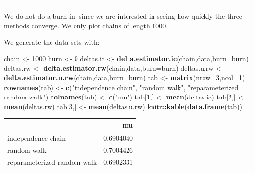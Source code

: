 \documentclass[
  11pt,
]{paper}
\newenvironment{Shaded}{\begin{snugshade}}{\end{snugshade}}
\newcommand{\AttributeTok}[1]{\textcolor[rgb]{0.13,0.29,0.53}{#1}}
\newcommand{\DecValTok}[1]{\textcolor[rgb]{0.00,0.00,0.81}{#1}}
\newcommand{\FunctionTok}[1]{\textcolor[rgb]{0.13,0.29,0.53}{\textbf{#1}}}
\newcommand{\NormalTok}[1]{#1}
\newcommand{\OtherTok}[1]{\textcolor[rgb]{0.56,0.35,0.01}{#1}}
\newcommand{\SpecialCharTok}[1]{\textcolor[rgb]{0.81,0.36,0.00}{\textbf{#1}}}
\newcommand{\StringTok}[1]{\textcolor[rgb]{0.31,0.60,0.02}{#1}}
\begin{document}
\begin{center}\rule{0.5\linewidth}{0.5pt}\end{center}

We do not do a burn-in, since we are interested in seeing how quickly
the three methods converge. We only plot chains of length \(1000\).

We generate the data sets with:

\begin{Shaded}
\begin{Highlighting}[]
\NormalTok{chain }\OtherTok{\textless{}{-}} \DecValTok{1000}
\NormalTok{burn }\OtherTok{\textless{}{-}} \DecValTok{0}
\NormalTok{deltas.ic }\OtherTok{\textless{}{-}} \FunctionTok{delta.estimator.ic}\NormalTok{(chain,data,}\AttributeTok{burn=}\NormalTok{burn)}
\NormalTok{deltas.rw }\OtherTok{\textless{}{-}} \FunctionTok{delta.estimator.rw}\NormalTok{(chain,data,}\AttributeTok{burn=}\NormalTok{burn)}
\NormalTok{deltas.u.rw }\OtherTok{\textless{}{-}} \FunctionTok{delta.estimator.u.rw}\NormalTok{(chain,data,}\AttributeTok{burn=}\NormalTok{burn)}
\NormalTok{tab }\OtherTok{\textless{}{-}} \FunctionTok{matrix}\NormalTok{(}\AttributeTok{nrow=}\DecValTok{3}\NormalTok{,}\AttributeTok{ncol=}\DecValTok{1}\NormalTok{)}
\FunctionTok{rownames}\NormalTok{(tab) }\OtherTok{\textless{}{-}} \FunctionTok{c}\NormalTok{(}\StringTok{"independence chain"}\NormalTok{,}
                   \StringTok{"random walk"}\NormalTok{,}
                   \StringTok{"reparameterized random walk"}\NormalTok{)}
\FunctionTok{colnames}\NormalTok{(tab) }\OtherTok{\textless{}{-}} \FunctionTok{c}\NormalTok{(}\StringTok{"mu"}\NormalTok{)}
\NormalTok{tab[}\DecValTok{1}\NormalTok{,] }\OtherTok{\textless{}{-}} \FunctionTok{mean}\NormalTok{(deltas.ic)}
\NormalTok{tab[}\DecValTok{2}\NormalTok{,] }\OtherTok{\textless{}{-}} \FunctionTok{mean}\NormalTok{(deltas.rw)}
\NormalTok{tab[}\DecValTok{3}\NormalTok{,] }\OtherTok{\textless{}{-}} \FunctionTok{mean}\NormalTok{(deltas.u.rw)}
\NormalTok{knitr}\SpecialCharTok{::}\FunctionTok{kable}\NormalTok{(}\FunctionTok{data.frame}\NormalTok{(tab))}
\end{Highlighting}
\end{Shaded}

\begin{longtable}[]{@{}lr@{}}
\toprule\noalign{}
& mu \\
\midrule\noalign{}
\endhead
\bottomrule\noalign{}
\endlastfoot
independence chain & 0.6904040 \\
random walk & 0.7004426 \\
reparameterized random walk & 0.6902331 \\
\end{longtable}
\end{document}
